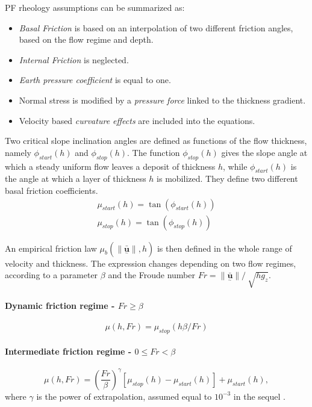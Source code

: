 \documentclass{article}
\begin{document}
PF rheology assumptions can be summarized as:
\begin{itemize}
\item \textit{Basal Friction} is based on an interpolation of two different friction angles, based on the flow regime and depth.

\item \textit{Internal Friction} is neglected.

\item \textit{Earth pressure coefficient} is equal to one.

\item Normal stress is modified by a \textit{pressure force} linked to the thickness gradient.

\item Velocity based \textit{curvature effects} are included into the equations.
\end{itemize}

Two critical slope inclination angles are defined as functions of the flow thickness, namely $\phi_{start}(h)$ and $\phi_{stop}(h)$. The function $\phi_{stop}(h)$ gives the slope angle at which a steady uniform flow leaves a deposit of thickness $h$, while $\phi_{start}(h)$ is the angle at which a layer of thickness $h$ is mobilized. They define two different basal friction coefficients.
\begin{eqnarray}
\mu_{start}(h)=\tan(\phi_{start}(h))\\
\mu_{stop}(h)=\tan(\phi_{stop}(h))
\end{eqnarray}

An empirical friction law $\mu_{b}(\|\underset{^\sim}{\bar{\textbf{u}}} \| , h)$ is then defined in the whole range of velocity and thickness. The expression changes depending on two flow regimes, according to a parameter $\beta$ and the Froude number $Fr=\| \underset{^\sim}{\bar{\textbf{u}}} \| / \ \sqrt{h g_{z}}$.

\paragraph{Dynamic friction regime - $Fr \ge \beta$}
\begin{equation}\label{mu_beta1}
\mu(h, Fr)=\mu_{stop}(h \beta / Fr)
\end{equation}

\paragraph{Intermediate friction regime - $0 \le Fr < \beta$}
\begin{equation}\label{mu_beta2}
\mu(h, Fr)=\left(\frac{Fr}{\beta}\right)^\gamma [\mu_{stop}(h)-\mu_{start}(h)] + \mu_{start}(h),
\end{equation}
where $\gamma$ is the power of extrapolation, assumed equal to $10^{-3}$ in the sequel \citep{PouliquenForterre2002}.
\end{document}
